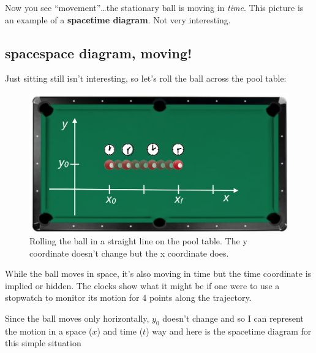 \documentclass[
  letterpaper,
  DIV=11,
  numbers=noendperiod,
  oneside]{scrreprt}
\begin{document}
Now you see ``movement''\ldots the stationary ball is moving in
\emph{time}. This picture is an example of a \textbf{spacetime diagram}.
Not very interesting.

\subsection{spacespace diagram,
moving!}\label{spacespace-diagram-moving}

Just sitting still isn't interesting, so let's roll the ball across the
pool table:

\begin{figure}[H]

{\centering \includegraphics[width=0.8\linewidth,height=\textheight,keepaspectratio]{mechanics/motion/screenshot_3665.png}

}

\caption{Rolling the ball in a straight line on the pool table. The y
coordinate doesn't change but the x coordinate does.}

\end{figure}%

While the ball moves in space, it's also moving in time but the time
coordinate is implied or hidden. The clocks show what it might be if one
were to use a stopwatch to monitor its motion for 4 points along the
trajectory.

Since the ball moves only horizontally, \(y_0\) doesn't change and so I
can represent the motion in a space (\(x\)) and time (\(t\)) way and
here is the spacetime diagram for this simple situation
\end{document}
